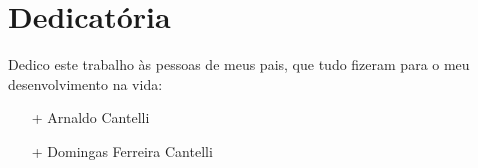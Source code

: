 
\thispagestyle{empty}

\chapter{Dedicatória}

Dedico este trabalho às pessoas de meus pais, que tudo fizeram para o meu desenvolvimento na vida:
\begin{itemize}
    \item[+] Arnaldo Cantelli
    \item[+] Domingas Ferreira Cantelli
\end{itemize}